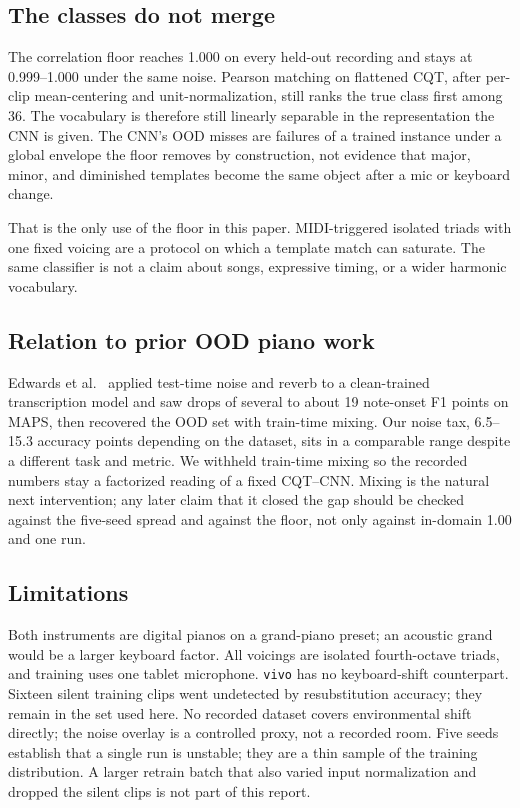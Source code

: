 \documentclass[pdflatex,sn-mathphys-num,iicol]{sn-jnl}
\theoremstyle{thmstyleone}
\theoremstyle{thmstyletwo}
\theoremstyle{thmstylethree}
\begin{document}
\subsection{The classes do not merge}\label{subsec5_1}

The correlation floor reaches 1.000 on every held-out recording and stays at 0.999--1.000 under the same noise. Pearson matching on flattened CQT, after per-clip mean-centering and unit-normalization, still ranks the true class first among 36. The vocabulary is therefore still linearly separable in the representation the CNN is given. The CNN's OOD misses are failures of a trained instance under a global envelope the floor removes by construction, not evidence that major, minor, and diminished templates become the same object after a mic or keyboard change.

That is the only use of the floor in this paper. MIDI-triggered isolated triads with one fixed voicing are a protocol on which a template match can saturate. The same classifier is not a claim about songs, expressive timing, or a wider harmonic vocabulary.

\subsection{Relation to prior OOD piano work}\label{subsec5_2}

Edwards et al.\ \cite{Edwards2024} applied test-time noise and reverb to a clean-trained transcription model and saw drops of several to about 19 note-onset F1 points on MAPS, then recovered the OOD set with train-time mixing. Our noise tax, 6.5--15.3 accuracy points depending on the dataset, sits in a comparable range despite a different task and metric. We withheld train-time mixing so the recorded numbers stay a factorized reading of a fixed CQT--CNN. Mixing is the natural next intervention; any later claim that it closed the gap should be checked against the five-seed spread and against the floor, not only against in-domain 1.00 and one run.

\subsection{Limitations}\label{subsec5_3}

Both instruments are digital pianos on a grand-piano preset; an acoustic grand would be a larger keyboard factor. All voicings are isolated fourth-octave triads, and training uses one tablet microphone. \texttt{vivo} has no keyboard-shift counterpart. Sixteen silent training clips went undetected by resubstitution accuracy; they remain in the set used here. No recorded dataset covers environmental shift directly; the noise overlay is a controlled proxy, not a recorded room. Five seeds establish that a single run is unstable; they are a thin sample of the training distribution. A larger retrain batch that also varied input normalization and dropped the silent clips is not part of this report.
\end{document}
